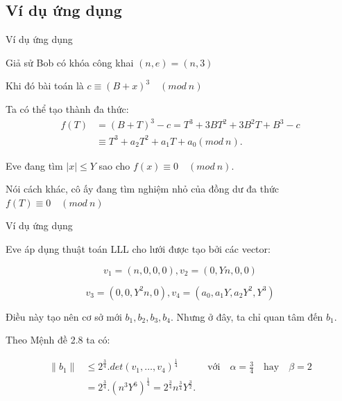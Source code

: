 \documentclass{beamer}
\numberwithin{equation}{section}
\begin{document}
\subsection{Ví dụ ứng dụng}
\begin{frame}{Ví dụ ứng dụng}

Giả sử Bob có khóa công khai $(n, e) = (n, 3)$

Khi đó bài toán là $c \equiv (B+x)^3 \quad (mod \ n)$

Ta có thể tạo thành đa thức:
$$
\begin{aligned}
f(T) & = (B+T)^3 - c = T^3 + 3BT^2 + 3B^2T + B^3 -c\\
& \equiv T^3 + a_2T^2 + a_1T + a_0 (mod \ n).
\end{aligned}
$$

Eve đang tìm $|x| \leq Y$ sao cho $f(x) \equiv 0 \quad (mod \ n)$.

Nói cách khác, cô ấy đang tìm nghiệm nhỏ của đồng dư đa thức $f(T) \equiv 0 \quad (mod \ n)$

\end{frame}
\begin{frame}{Ví dụ ứng dụng}

Eve áp dụng thuật toán LLL cho lưới được tạo bởi các vector:

$$v_1 =(n, 0, 0, 0), v_2 = (0, Yn, 0, 0) $$

$$ v_3 = (0, 0, Y^2n, 0), v_4 = (a_0, a_1Y, a_2Y^2, Y^3)$$

Điều này tạo nên cơ sở mới $b_1, b_2, b_3, b_4$. Nhưng ở đây, ta chỉ quan tâm đến $b_1$.

Theo Mệnh đề 2.8 ta có:

$$
\begin{aligned}
\|b_1\| & \leq 2^{\tfrac{3}{4}}.det(v_1, \dots, v_4)^{\tfrac{1}{4}} \qquad \quad \text{với} \quad \alpha = \frac{3}{4} \quad \text{hay} \quad \beta = 2 \\
& = 2^{\tfrac{3}{4}}.(n^{3}Y^{6})^{\tfrac{1}{4}} = 2^{\tfrac{3}{4}}n^{\tfrac{3}{4}}Y^{\tfrac{3}{2}} \text{.}
\end{aligned}
$$


\end{frame}
\end{document}
